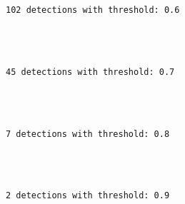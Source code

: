\documentclass[11pt]{article}
\begin{document}
    \begin{Verbatim}[commandchars=\\\{\}]
102 detections with threshold: 0.6


    \end{Verbatim}

    \begin{center}
    \end{center}
    { \hspace*{\fill} \\}
    
    \begin{Verbatim}[commandchars=\\\{\}]
45 detections with threshold: 0.7


    \end{Verbatim}

    \begin{center}
    \end{center}
    { \hspace*{\fill} \\}
    
    \begin{Verbatim}[commandchars=\\\{\}]
7 detections with threshold: 0.8


    \end{Verbatim}

    \begin{center}
    \end{center}
    { \hspace*{\fill} \\}
    
    \begin{Verbatim}[commandchars=\\\{\}]
2 detections with threshold: 0.9


    \end{Verbatim}

    \begin{center}
    \end{center}
    { \hspace*{\fill} \\}
    
\end{document}
